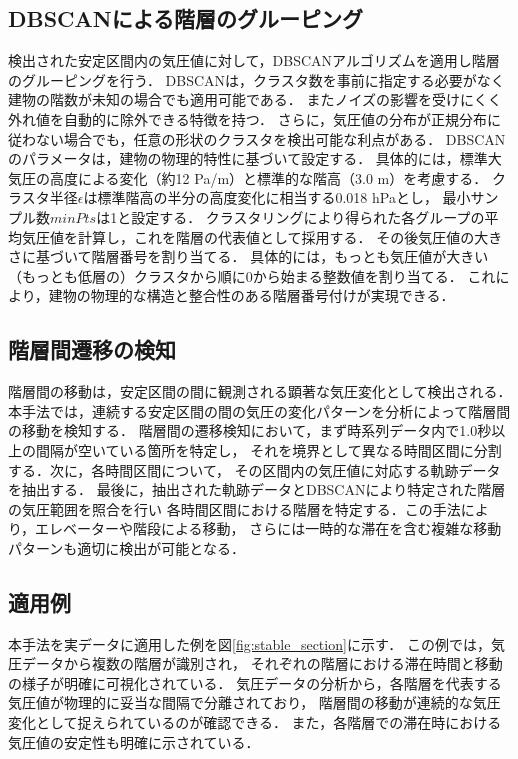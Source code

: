 \subsection{DBSCANによる階層のグルーピング}
検出された安定区間内の気圧値に対して，DBSCANアルゴリズムを適用し階層のグルーピングを行う．
DBSCANは，クラスタ数を事前に指定する必要がなく建物の階数が未知の場合でも適用可能である．
またノイズの影響を受けにくく外れ値を自動的に除外できる特徴を持つ．
さらに，気圧値の分布が正規分布に従わない場合でも，任意の形状のクラスタを検出可能な利点がある．
DBSCANのパラメータは，建物の物理的特性に基づいて設定する．
具体的には，標準大気圧の高度による変化（約12 Pa/m）と標準的な階高（3.0 m）を考慮する．
クラスタ半径$\epsilon$は標準階高の半分の高度変化に相当する0.018 hPaとし，
最小サンプル数$minPts$は1と設定する．
クラスタリングにより得られた各グループの平均気圧値を計算し，これを階層の代表値として採用する．
その後気圧値の大きさに基づいて階層番号を割り当てる．
具体的には，もっとも気圧値が大きい（もっとも低層の）クラスタから順に0から始まる整数値を割り当てる．
これにより，建物の物理的な構造と整合性のある階層番号付けが実現できる．

\subsection{階層間遷移の検知}
階層間の移動は，安定区間の間に観測される顕著な気圧変化として検出される．
本手法では，連続する安定区間の間の気圧の変化パターンを分析によって階層間の移動を検知する．
階層間の遷移検知において，まず時系列データ内で1.0秒以上の間隔が空いている箇所を特定し，
それを境界として異なる時間区間に分割する．次に，各時間区間について，
その区間内の気圧値に対応する軌跡データを抽出する．
最後に，抽出された軌跡データとDBSCANにより特定された階層の気圧範囲を照合を行い
各時間区間における階層を特定する．この手法により，エレベーターや階段による移動，
さらには一時的な滞在を含む複雑な移動パターンも適切に検出が可能となる．

\subsection{適用例}
本手法を実データに適用した例を図\ref{fig:stable_section}に示す．
この例では，気圧データから複数の階層が識別され，
それぞれの階層における滞在時間と移動の様子が明確に可視化されている．
気圧データの分析から，各階層を代表する気圧値が物理的に妥当な間隔で分離されており，
階層間の移動が連続的な気圧変化として捉えられているのが確認できる．
また，各階層での滞在時における気圧値の安定性も明確に示されている．


